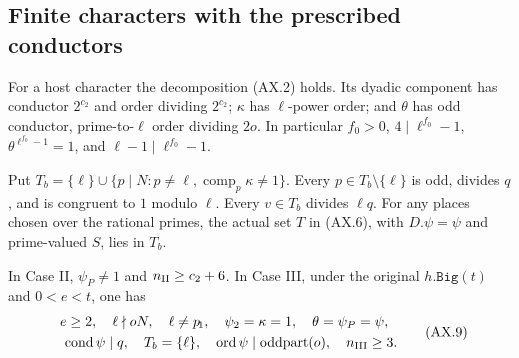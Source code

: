 \subsection{Finite characters with the prescribed conductors}

\begin{proposition}
\label{prop:ax-host}
For a host character the decomposition (AX.2) holds.  Its dyadic
component has conductor $2^{c_2}$ and order dividing $2^{c_2}$;
$\kappa$ has $\ell$-power order; and $\theta$ has odd conductor,
prime-to-$\ell$ order dividing $2o$.
In particular $f_0>0$, $4\mid\ell^{f_0}-1$,
$\theta^{\ell^{f_0}-1}=1$, and $\ell-1\mid\ell^{f_0}-1$.

Put $T_b=\{\ell\}\cup\{p\mid N:p\ne\ell,
\operatorname{comp}_p\kappa\ne1\}$.  Every $p\in T_b\setminus\{\ell\}$
is odd, divides $q$, and is congruent to $1$ modulo $\ell$.
Every $v\in T_b$ divides $\ell q$.
For any places chosen over the rational primes, the actual set
$T$ in (AX.6), with $D.\psi=\psi$ and prime-valued $S$, lies in $T_b$.

In Case II, $\psi_P\ne1$ and $n_{\rm II}\ge c_2+6$.
In Case III, under the original $h.\mathtt{Big}(t)$ and
$0<e<t$, one has
\[
 \begin{gathered}
 e\ge2,\quad\ell\nmid oN,\quad\ell\ne p_{\!1},
 \quad\psi_2=\kappa=1,\quad\theta=\psi_P=\psi,\\
 \quad\operatorname{cond}\psi\mid q,\quad T_b=\{\ell\},
 \quad\operatorname{ord}\psi\mid\operatorname{oddpart}(o),
 \quad n_{\rm III}\ge3.
 \end{gathered}
 \tag{AX.9}
\]
\end{proposition}

